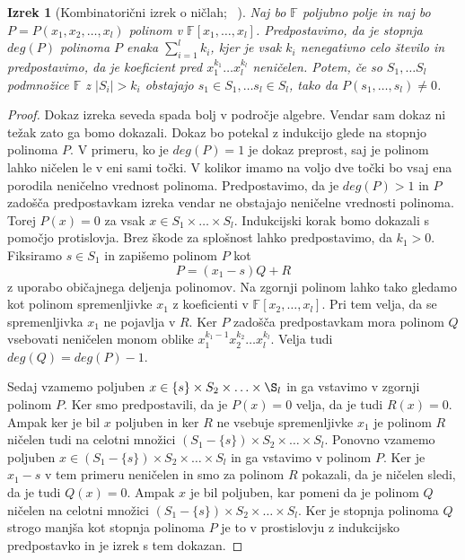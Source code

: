 \documentclass[12pt,a4paper,twoside]{article}
\theoremstyle{definition} %
\theoremstyle{plain} %
\newtheorem{izrek}[definicija]{Izrek}
\numberwithin{equation}{section}  %
\begin{document}
\begin{izrek}[Kombinatorični izrek o ničlah; ~\citet{null}]
\label{zeros}
Naj bo $\mathbb{F}$ poljubno polje in naj bo $P = P(x_1, x_2, \ldots, x_l)$ polinom v $\mathbb{F}[x_1, \ldots, x_l]$. Predpostavimo, da je stopnja $deg(P)$ polinoma $P$ enaka $\sum_{i=1}^l k_i$, kjer je vsak $k_i$ nenegativno celo število in predpostavimo, da je koeficient pred $x_1^{k_1} \ldots x_l^{k_l}$ neničelen. Potem, če so $S_1, \ldots S_l$ podmnožice $\mathbb{F}$ z $|S_i| > k_i $ obstajajo $s_1 \in S_1, \ldots s_l \in S_l$, tako da $P(s_1, \ldots, s_l) \neq 0$.
\end{izrek}

\begin{proof}
Dokaz izreka seveda spada bolj v področje algebre. Vendar sam dokaz ni težak zato ga bomo dokazali. Dokaz bo potekal z indukcijo glede na stopnjo polinoma $P$. V primeru, ko je $deg(P) = 1$ je dokaz preprost, saj je polinom lahko ničelen le v eni sami točki. V kolikor imamo na voljo dve točki bo vsaj ena porodila neničelno vrednost polinoma. Predpostavimo, da je $deg(P) > 1$ in $P$ zadošča predpostavkam izreka vendar ne obstajajo neničelne vrednosti polinoma. Torej $P(x) = 0$ za vsak $x \in S_1 \times \ldots \times S_l$. Indukcijski korak bomo dokazali s pomočjo protislovja. Brez škode za splošnost lahko predpostavimo, da $k_1 > 0$. Fiksiramo $s \in S_1$ in zapišemo polinom $P$ kot 
$$ P = (x_1 - s)Q + R $$ 
z uporabo običajnega deljenja polinomov. Na zgornji polinom lahko tako gledamo kot polinom spremenljivke $x_1$ z koeficienti v $\mathbb{F}[x_2, \ldots, x_l]$. Pri tem velja, da se spremenljivka $x_1$ ne pojavlja v $R$. Ker $P$ zadošča predpostavkam mora polinom $Q$ vsebovati neničelen monom oblike  $x_1^{k_1 - 1} x_2^{k_2} \ldots x_l^{k_l}$. Velja tudi $deg(Q) = deg(P) - 1$.

Sedaj vzamemo poljuben $x \in \{s\} \times S_2 \times \ldots \times \S_l$ in ga vstavimo v zgornji polinom $P$. Ker smo predpostavili, da je $P(x)=0$ velja, da je tudi $R(x) = 0$. Ampak ker je bil $x$ poljuben in ker $R$ ne vsebuje spremenljivke $x_1$ je polinom $R$ ničelen tudi na celotni množici $(S_1 - \{s\}) \times S_2 \times \ldots \times S_l$. Ponovno vzamemo poljuben $x \in (S_1 - \{s\}) \times S_2 \times \ldots \times S_l $ in ga vstavimo v polinom $P$. Ker je $x_1 - s$ v tem primeru neničelen in smo za polinom $R$ pokazali, da je ničelen sledi, da je tudi $Q(x) = 0$. Ampak $x$ je bil poljuben, kar pomeni da je polinom $Q$ ničelen na celotni množici $ (S_1 - \{s\}) \times S_2 \times \ldots \times S_l$. Ker je stopnja polinoma $Q$ strogo manjša kot stopnja polinoma $P$ je to v prostislovju z indukcijsko predpostavko in je izrek s tem dokazan. 
\end{proof}
\end{document}
